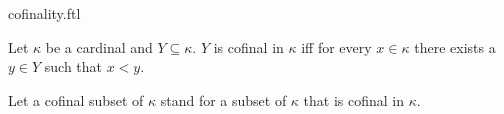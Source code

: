 \documentclass{naproche-library}
\begin{document}
\begin{smodule}[title=Cofinality]{cofinality.ftl}

\begin{definition}[forthel,id=SET_THEORY_06_5621203645212879]
  Let $\kappa$ be a cardinal and $Y \subseteq \kappa$.
  $Y$ is cofinal in $\kappa$ iff for every $x \in \kappa$ there exists a $y \in Y$ such that $x < y$.

  Let a cofinal subset of $\kappa$ stand for a subset of $\kappa$ that is cofinal in $\kappa$.
\end{definition}
\end{smodule}
\end{document}
